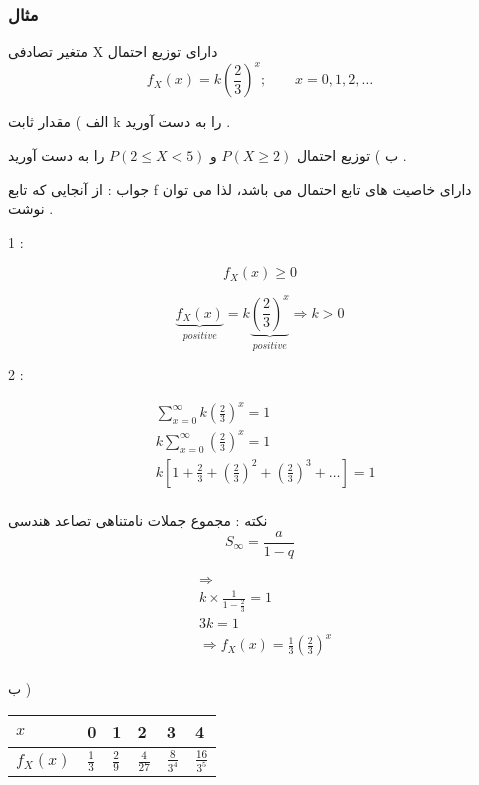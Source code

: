 \documentclass[12pt]{book}
\begin{document}
\subsubsection{مثال}

متغیر تصادفی X دارای توزیع احتمال 
$$
f_{X}(x) = k (\frac{2}{3})^{x} ; \qquad x = 0 ,1 , 2, \dots
$$

الف ) مقدار ثابت k را به دست آورید .

ب ) توزیع احتمال 
$P( X \geq 2 )$
و
$P( 2 \leq X < 5 )$
را به دست آورید .

جواب : از آنجایی که تابع f دارای خاصیت های تابع احتمال می باشد، لذا می توان نوشت .

1 :

$$
f_{X}(x) \geq 0
$$

$$
\underbrace{f_{X}(x)}_{positive} = k \underbrace{(\frac{2}{3})^{x}}_{positive} \Rightarrow k > 0
$$


2 :

\begin{align*}
&\sum_{x=0}^{\infty}{k (\frac{2}{3})^{x} } = 1 \\
& k \sum_{x=0}^{\infty}{(\frac{2}{3})^{x} } = 1 \\
& k [1 + \frac{2}{3} + (\frac{2}{3})^{2} + (\frac{2}{3})^{3} + \dots ] = 1 \\
\end{align*}


نکته : مجموع جملات نامتناهی تصاعد هندسی 
$$
S_{\infty} = \frac{a}{1-q}
$$


\begin{align*}
&\Rightarrow \\
&k \times \frac{1}{1 - \frac{2}{3} } = 1 \\
&3 k = 1 \\
&\Rightarrow f_{X}(x) = \frac{1}{3}(\frac{2}{3})^{x} \\
\end{align*}


ب ) 

\begin{center}
\begin{latin}
\begin{tabular}{ l |  l  l  l  l  l }
  $x$ & 0 & 1 & 2 & 3  & 4 \\
  \hline
  $f_{X}(x)$ & $\frac{1}{3}$ & $\frac{2}{9}$ & $\frac{4}{27}$  & $\frac{8}{3^{4}}$ & $\frac{16}{3^{5}}$ \\
\end{tabular}
\end{latin}
\end{center}
\end{document}
